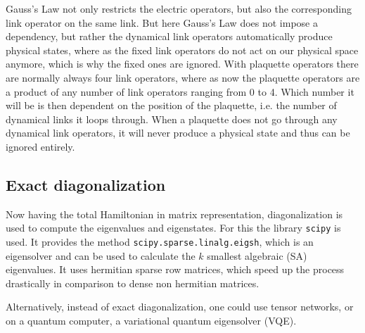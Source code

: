 Gauss's Law not only restricts the electric operators, but also the corresponding link operator on the same link. But here Gauss's Law does not impose a dependency, but rather the dynamical link operators automatically produce physical states, where as the fixed link operators do not act on our physical space anymore, which is why the fixed ones are ignored. With plaquette operators there are normally always four link operators, where as now the plaquette operators are a product of any number of link operators ranging from 0 to 4. Which number it will be is then dependent on the position of the plaquette, i.e. the number of dynamical links it loops through. When a plaquette does not go through any dynamical link operators, it will never produce a physical state and thus can be ignored entirely.

\subsection{Exact diagonalization}
Now having the total Hamiltonian in matrix representation, diagonalization is used to compute the eigenvalues and eigenstates. For this the library \texttt{scipy} \cite{2020SciPy-NMeth} is used. It provides the method \texttt{scipy.sparse.linalg.eigsh}, which is an eigensolver and can be used to calculate the $k$ smallest algebraic (SA) eigenvalues. It uses hermitian sparse row matrices, which speed up the process drastically in comparison to dense non hermitian matrices.

Alternatively, instead of exact diagonalization, one could use tensor networks\cite{wu2025accurategaugeinvarianttensornetwork, Singh_2011}, or on a quantum computer, a variational quantum eigensolver (VQE)\cite{crippa2024}.

